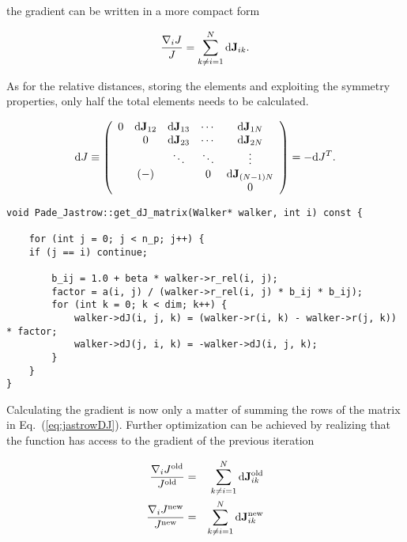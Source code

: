 the gradient can be written in a more compact form

\begin{equation}
 \frac{\nabla_i J}{J} = \sum_{k \ne i = 1}^N \mathrm{d}\mathbf{J}_{ik}.
\end{equation}

As for the relative distances, storing the elements and exploiting the symmetry properties, only half the total elements needs to be calculated. 

\begin{equation}
\label{eq:jastrowDJ}
 \mathrm{d}J\equiv \left( \begin{array}{ccccc}
0 & \mathrm{d}\mathbf{J}_{12} & \mathrm{d}\mathbf{J}_{13} & \cdots & \mathrm{d}\mathbf{J}_{1N} \\
 & 0 & \mathrm{d}\mathbf{J}_{23} & \cdots & \mathrm{d}\mathbf{J}_{2N}  \\
 &  & \ddots & \ddots & \vdots \\
 & (-) &  & 0 & \mathrm{d}\mathbf{J}_{(N-1)N} \\
 &  &  &  & 0\end{array} \right)  = -\mathrm{d}J^T.
\end{equation}

\vspace{0.5cm}
\begin{lstlisting}
void Pade_Jastrow::get_dJ_matrix(Walker* walker, int i) const {
    
    for (int j = 0; j < n_p; j++) {
	if (j == i) continue;
	
        b_ij = 1.0 + beta * walker->r_rel(i, j);
        factor = a(i, j) / (walker->r_rel(i, j) * b_ij * b_ij);
        for (int k = 0; k < dim; k++) {
            walker->dJ(i, j, k) = (walker->r(i, k) - walker->r(j, k)) * factor;
            walker->dJ(j, i, k) = -walker->dJ(i, j, k);
        }
    }
}
\end{lstlisting}


Calculating the gradient is now only a matter of summing the rows of the matrix in Eq.~(\ref{eq:jastrowDJ}). Further optimization can be achieved by realizing that the function has access to the gradient of the previous iteration

\begin{eqnarray}
  \frac{\nabla_i J^\mathrm{old}}{J^\mathrm{old}} &=& \sum_{k \ne i = 1}^N \mathrm{d}\mathbf{J}^\mathrm{old}_{ik} \\
  \frac{\nabla_i J^\mathrm{new}}{J^\mathrm{new}} &=& \sum_{k \ne i = 1}^N \mathrm{d}\mathbf{J}^\mathrm{new}_{ik} \label{eq:jastrowGradDJnew}
\end{eqnarray}

